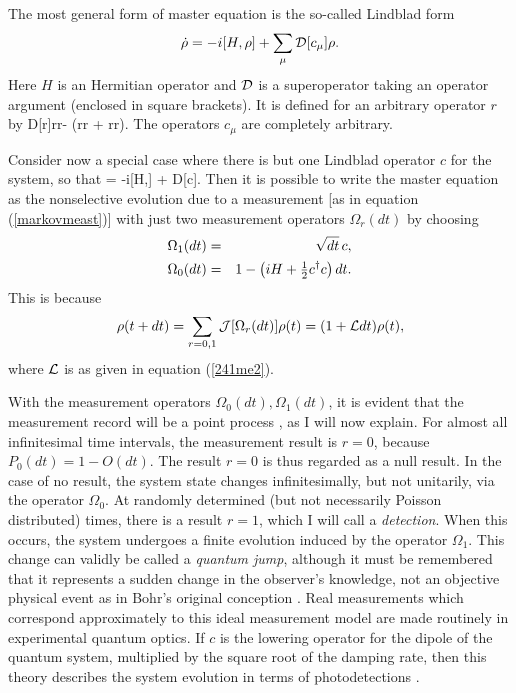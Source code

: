 The most general form of master equation is the so-called Lindblad form
\cite{Lin76,Gar91}
\begin{equation} \label{241me1} \label{Lin}
\dot{\rho} = -{i}[H,\rho] + \sum_\mu  {\cal D}[c_\mu] \rho.
\end{equation}
Here $H$ is an Hermitian operator and ${\cal D}$ is a 
superoperator taking an operator argument (enclosed in square brackets). It is 
defined for an arbitrary operator $r$ by
\beq \label{defcalD}
{\cal D}[r]\rho \equiv r\rho r\dg -  (r\dg r \rho + \rho r\dg r).
\eeq
The operators $c_\mu$ are completely arbitrary. 

Consider now a special case where there is but one Lindblad operator $c$ for the
system, so that 
\beq \label{241me2}
\dot{\rho} = -i[H,\rho] + {\cal D}[c]\rho {}\rho.
\eeq
 Then it is possible to write the master
equation as the nonselective evolution due to a measurement [as in equation
(\ref{markovmeast})] with just two measurement operators $\Omega_r(dt)$ by choosing
\begin{eqnarray} \Omega_1(dt) &=& \sqrt{dt}\, c , \\
\Omega_0(dt) &= &1 - \left( {i}H + \mbox{$\frac{1}{2}$}c^\dagger c \right) dt.
\end{eqnarray}
This is because 
\begin{equation} \label{me2a}
\rho(t+dt) = \sum_{r=0,1} {\cal J}[\Omega_r(dt)] \rho(t) 
 = (1+{\cal L}dt)\rho(t),
\end{equation}
where ${\cal L}$ is as given in equation (\ref{241me2}). 

With the measurement operators $\Omega_0(dt),\Omega_1(dt)$, 
it is evident that the measurement record will be a point process \cite{CoxIsh80},
as I will now explain. For almost all infinitesimal time intervals, the  measurement
result is $r = 0$, because $P_0(dt) = 1 - O(dt)$. The result $r=0$ is thus
regarded as a  null result. In the case of no result, the system state changes
infinitesimally, but not unitarily, via the operator  $\Omega_0$. At randomly
determined (but not necessarily Poisson  distributed) times, there is a result $r =
1$, which I will call  a {\em detection}. When this occurs, the system undergoes a
finite  evolution induced by the operator $\Omega_1$. This change can validly be 
called a {\em quantum jump}, although it must be remembered that it  represents a
sudden change in the observer's knowledge, not an  objective physical event as in
Bohr's original conception  \cite{Boh13}. Real measurements 
which correspond approximately to this ideal measurement model are made routinely 
in experimental quantum 
optics. If $c$ is the lowering operator for the dipole of the quantum system,
multiplied by the  square root of the damping rate, then this theory describes 
the  system evolution in terms of photodetections \cite{Wis95b}. 

